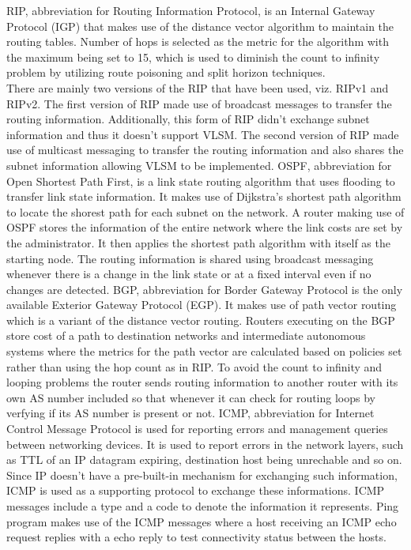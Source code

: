 \documentclass{home_assignment}
\begin{document}
RIP, abbreviation for Routing Information Protocol, is an Internal Gateway Protocol (IGP) that makes use of the distance vector algorithm to maintain the routing tables. Number of hops is selected as the metric for the algorithm with the maximum being set to 15, which is used to diminish the count to infinity problem by utilizing route poisoning and split horizon techniques. 
\\
There are mainly two versions of the RIP that have been used, viz. RIPv1 and RIPv2. The first version of RIP made use of broadcast messages to transfer the routing information. Additionally, this form of RIP didn't exchange subnet information and thus it doesn't support VLSM. The second version of RIP made use of multicast messaging to transfer the routing information and also shares the subnet information allowing VLSM to be implemented.
OSPF, abbreviation for Open Shortest Path First, is a link state routing algorithm that uses flooding to transfer link state information. It makes use of Dijkstra's shortest path algorithm to locate the shorest path for each subnet on the network. A router making use of OSPF stores the information of the entire network where the link costs are set by the administrator. It then applies the shortest path algorithm with itself as the starting node. The routing information is shared using broadcast messaging whenever there is a change in the link state or at a fixed interval even if no changes are detected. 
BGP, abbreviation for Border Gateway Protocol is the only available Exterior Gateway Protocol (EGP). It makes use of path vector routing which is a variant of the distance vector routing. Routers executing on the BGP store cost of a path to destination networks and intermediate autonomous systems where the metrics for the path vector are calculated based on policies set rather than using the hop count as in RIP. To avoid the count to infinity and looping problems the router sends routing information to another router with its own AS number included so that whenever it can check for routing loops by verfying if its AS number is present or not. 
ICMP, abbreviation for Internet Control Message Protocol is used for reporting errors and management queries between networking devices. It is used to report errors in the network layers, such as TTL of an IP datagram expiring, destination host being unrechable and so on. Since IP doesn't have a pre-built-in mechanism for exchanging such information, ICMP is used as a supporting protocol to exchange these informations. ICMP messages include a type and a code to denote the information it represents. Ping program makes use of the ICMP messages where a host receiving an ICMP echo request replies with a echo reply to test connectivity status between the hosts.
\end{document}
